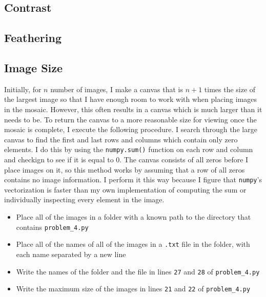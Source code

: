 \documentclass[]{article}
\begin{document}
	\subsection{Contrast}
	\subsection{Feathering}
	\subsection{Image Size}
	Initially, for $n$ number of images, I make a canvas that is $n+1$ times the size of the largest image so that I have enough room to work with when placing images in the mosaic. However, this often results in a canvas which is much larger than it needs to be. To return the canvas to a more reasonable size for viewing once the mosaic is complete, I execute the following procedure. I search through the large canvas to find the first and last rows and columns which contain only zero elements. I do this by using the \texttt{numpy.sum()} function on each row and column and checkign to see if it is equal to 0. The canvas consists of all zeros before I place images on it, so this method works by assuming that a row of all zeros contains no image information. I perform it this way because I figure that \texttt{numpy}'s vectorization is faster than my own implementation of computing the sum or individually inspecting every element in the image. 
	\begin{itemize}
	\item Place all of the images in a folder with a known path to the directory that contains \texttt{problem\_4.py}
	\item Place all of the names of all of the images in a \texttt{.txt} file in the folder, with each name separated by a new line
	\item Write the names of the folder and the file in lines \texttt{27} and \texttt{28} of \texttt{problem\_4.py}
	\item Write the maximum size of the images in lines \texttt{21} and \texttt{22} of \texttt{problem\_4.py}
	
\end{itemize}
\end{document}
